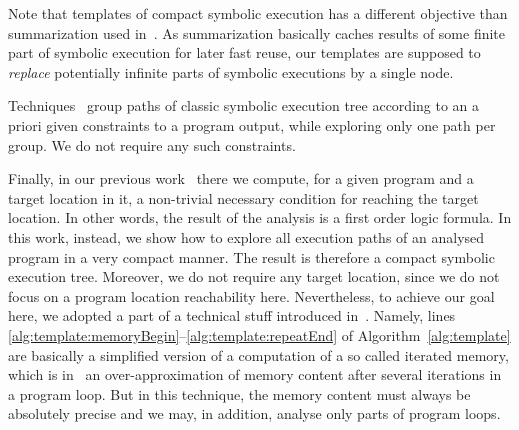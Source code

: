 \documentclass{sig-alternate}%
\begin{document}
Note that templates of compact symbolic execution has a different
objective than summarization used in~\cite{G07,AGT08,GL11}. As
summarization basically caches results of some finite part of symbolic
execution for later fast reuse, our templates are supposed to
\emph{replace} potentially infinite parts of symbolic executions by a
single node.

Techniques~\cite{QNR11,SH10} group paths of classic symbolic
execution tree according to an a priori given constraints to a program
output, while exploring only one path per group. We do not require any such
constraints.

Finally, in our previous work~\cite{ST12} there we compute, for a
given program and a target location in it, a non-trivial necessary
condition for reaching the target location. In other words, the result
of the analysis is a first order logic formula. In this work, instead,
we show how to explore all execution paths of an analysed program in a
very compact manner. The result is therefore a compact symbolic
execution tree. Moreover, we do not require any target location, since
we do not focus on a program location reachability here. Nevertheless,
to achieve our goal here, we adopted a part of a technical stuff
introduced in~\cite{ST12}. Namely, lines
\ref{alg:template:memoryBegin}--\ref{alg:template:repeatEnd} of
Algorithm~\ref{alg:template} are basically a simplified version of a
computation of a so called iterated memory, which is in~\cite{ST12} an
over-approximation of memory content after several iterations in a
program loop. But in this technique, the memory content must always be
absolutely precise and we may, in addition, analyse only parts of
program loops.

%
\end{document}
